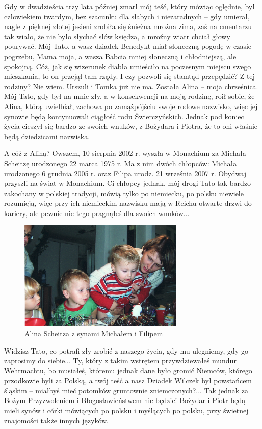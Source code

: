 Gdy w dwadzieścia trzy lata później zmarł mój teść, który mówiąc oględnie, był człowiekiem twardym, bez szacunku dla słabych i niezaradnych – gdy umierał, nagle z pięknej złotej jesieni zrobiła się śnieżna mroźna zima, zaś na cmentarzu tak wiało, że nie było słychać słów księdza, a mroźny wiatr chciał głowy pourywać. Mój Tato, a wasz dziadek Benedykt miał słoneczną pogodę w czasie pogrzebu, Mama moja, a wasza Babcia mniej słoneczną i chłodniejszą, ale spokojną. Cóż, jak się wizerunek diabła umieściło na poczesnym miejscu swego mieszkania, to on przejął tam rządy. I czy pozwoli się stamtąd przepędzić? Z tej rodziny? Nie wiem. Urszuli i Tomka już nie ma. Została Alina – moja chrześnica. Mój Tato, gdy był na mnie zły, a w konsekwencji na moją rodzinę, roił sobie, że Alina, którą uwielbiał, zachowa po zamążpójściu swoje rodowe nazwisko, więc jej synowie będą kontynuowali ciągłość rodu Świerczyńskich. Jednak pod koniec życia cieszył się bardzo ze swoich wnuków, z Bożydara i Piotra, że to oni właśnie będą dziedzicami nazwiska.

A cóż z Aliną? Owszem, 10 sierpnia 2002 r. wyszła w Monachium za Michała Scheitzę urodzonego 22 marca 1975 r. Ma z nim dwóch chłopców: Michała urodzonego 6 grudnia 2005 r. oraz Filipa urodz. 21 września 2007 r. Obydwaj przyszli na świat w Monachium. Ci chłopcy jednak, mój drogi Tato tak bardzo zakochany w polskiej tradycji, mówią tylko po niemiecku, po polsku niewiele rozumieją, więc przy ich niemieckim nazwisku mają w Reichu otwarte drzwi do kariery, ale pewnie nie tego pragnąłeś dla swoich wnuków...
\begin{figure}[!h]
\begin{center}
\includegraphics[width=0.7\textwidth]{photo/alina_scheitz_z_synami.jpg}
\caption{Alina Scheitza z synami Michałem i Filipem}
\end{center}
\end{figure}

Widzisz Tato, co potrafi zły zrobić z naszego życia, gdy mu ulegniemy, gdy go zaprosimy do siebie... Ty, który z takim wstrętem przywdziewałeś mundur Wehrmachtu, bo musiałeś, któremu jednak dane było gromić Niemców, którego przodkowie byli za Polską, a twój teść a nasz Dziadek Wilczek był powstańcem śląskim – miałbyś mieć potomków gruntownie zniemczonych?... Tak jednak za Bożym Przyzwoleniem i Błogosławieństwem nie będzie! Bożydar i Piotr będą mieli synów i córki mówiących po polsku i myślących po polsku, przy świetnej znajomości także innych języków.